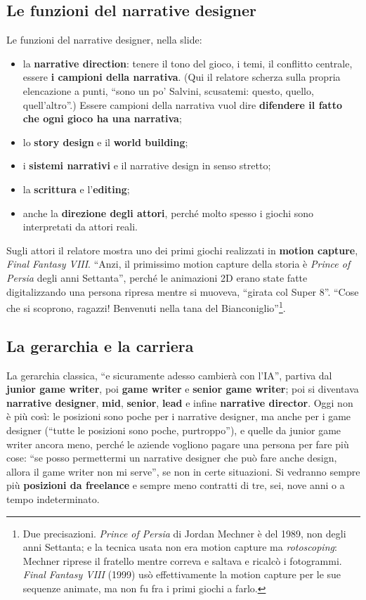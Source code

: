 \subsection{Le funzioni del narrative designer}

Le funzioni del narrative designer, nella slide:
\begin{itemize}
  \item la \textbf{narrative direction}: tenere il tono del gioco, i temi,
        il conflitto centrale, essere \textbf{i campioni della narrativa}.
        (Qui il relatore scherza sulla propria elencazione a punti, ``sono un
        po' Salvini, scusatemi: questo, quello, quell'altro''.) Essere
        campioni della narrativa vuol dire \textbf{difendere il fatto che
        ogni gioco ha una narrativa};
  \item lo \textbf{story design} e il \textbf{world building};
  \item i \textbf{sistemi narrativi} e il narrative design in senso
        stretto;
  \item la \textbf{scrittura} e l'\textbf{editing};
  \item anche la \textbf{direzione degli attori}, perché molto spesso i
        giochi sono interpretati da attori reali.
\end{itemize}

Sugli attori il relatore mostra uno dei primi giochi realizzati in
\textbf{motion capture}, \emph{Final Fantasy VIII}. ``Anzi, il primissimo
motion capture della storia è \emph{Prince of Persia} degli anni Settanta'',
perché le animazioni 2D erano state fatte digitalizzando una persona ripresa
mentre si muoveva, ``girata col Super 8''. ``Cose che si scoprono, ragazzi!
Benvenuti nella tana del Bianconiglio''\footnote{Due precisazioni.
\emph{Prince of Persia} di Jordan Mechner è del 1989, non degli anni
Settanta; e la tecnica usata non era motion capture ma
\emph{rotoscoping}: Mechner riprese il fratello mentre correva e saltava e
ricalcò i fotogrammi. \emph{Final Fantasy VIII} (1999) usò effettivamente
la motion capture per le sue sequenze animate, ma non fu fra i primi giochi a
farlo.}.

\subsection{La gerarchia e la carriera}

La gerarchia classica, ``e sicuramente adesso cambierà con l'IA'', partiva
dal \textbf{junior game writer}, poi \textbf{game writer} e \textbf{senior
game writer}; poi si diventava \textbf{narrative designer}, \textbf{mid},
\textbf{senior}, \textbf{lead} e infine \textbf{narrative director}. Oggi non
è più così: le posizioni sono poche per i narrative designer, ma anche per i
game designer (``tutte le posizioni sono poche, purtroppo''), e quelle da
junior game writer ancora meno, perché le aziende vogliono pagare una
persona per fare più cose: ``se posso permettermi un narrative designer che
può fare anche design, allora il game writer non mi serve'', se non in certe
situazioni. Si vedranno sempre più \textbf{posizioni da freelance} e sempre
meno contratti di tre, sei, nove anni o a tempo indeterminato.

